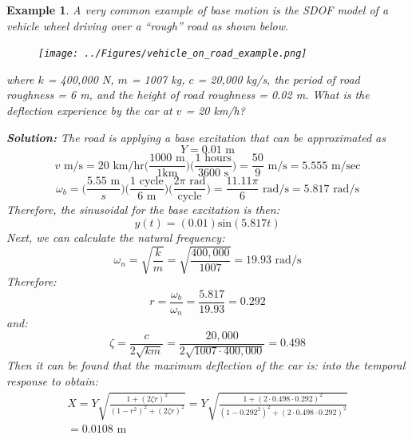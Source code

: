 \documentclass[12pt,letter]{article}
\newtheorem{ex}{Example}
\numberwithin{ex}{section} %
\newenvironment{example}{\begin{mdframed}[middlelinewidth=0.5mm]\begin{ex}\normalfont}{\end{ex}\end{mdframed}}
\numberwithin{re}{section} %
\begin{document}
				\begin{example}
	
					A very common example of base motion is the SDOF model of a vehicle wheel driving over a ``rough'' road as shown below. 
					\begin{figure}[H]
						\centering
						\texttt{[image: ../Figures/vehicle\_on\_road\_example.png]}
					\end{figure}				
					\noindent where $k$ = 400,000 N, $m$ = 1007 kg, $c$ = 20,000 kg/s, the period of road roughness = 6 m, and the height of road roughness = 0.02 m. What is the deflection experience by the car at $v$ = 20 km/h?
					
					\noindent\textbf{Solution:} The road is applying a base excitation that can be approximated as 
					\begin{equation}
						Y = 0.01 \text{ m}
					\end{equation} 				
					\begin{equation}
						v \text{ m/s} = 20 \text{ km/hr}\Bigg(\frac{1000 \text{ m}}{1 \text {km}}\Bigg) \Bigg(\frac{1 \text{ hours}}{3600 \text { s}}\Bigg) = \frac{50}{9} \text{ m/s} = 5.555 \text{ m/sec}
					\end{equation} 	
					\begin{equation}
						\omega_b = \Bigg(\frac{ 5.55 \text{ m}}{s}\Bigg) \Bigg(\frac{ 1 \text{ cycle}}{6 \text{ m}}\Bigg) \Bigg(\frac{ 2 \pi \text{ rad}}{\text {cycle}}\Bigg) = \frac{ 11.11 \pi }{6 } \text{ rad/s} =5.817 \text{ rad/s} 
					\end{equation} 	
					Therefore, the sinusoidal for the base excitation is then:
					\begin{equation}
						y(t) = (0.01) \text{sin}(5.817 t)
					\end{equation} 	
					Next, we can calculate the natural frequency:
					\begin{equation}
						\omega_n = \sqrt{\frac{k}{m}} = \sqrt{\frac{400,000}{1007}} = 19.93 \text{ rad/s}
					\end{equation} 			
					Therefore:
					\begin{equation}
					r=\frac{\omega_b}{\omega_n} = \frac{5.817}{19.93} =0.292
					\end{equation} 		
					and:
					\begin{equation}
					\zeta = \frac{c}{2\sqrt{km}}= \frac{20,000}{2\sqrt{1007\cdot400,000}} = 0.498
					\end{equation}	
					Then it can be found that the maximum deflection of the car is:
					into the temporal response to obtain:
					\begin{equation}
					\begin{split}
					X = Y \sqrt{\frac{1+(2 \zeta r)^2}{(1-r^2)^2 + (2 \zeta r )^2}} = Y \sqrt{\frac{1+(2 \cdot 0.498 \cdot 0.292)^2}{(1-0.292^2)^2 + (2 \cdot 0.498 \cdot 0.292 )^2}}  \\ = 0.0108 \text{ m}
					\end{split}
					\end{equation} 		
				\end{example}	
					
\end{document}
